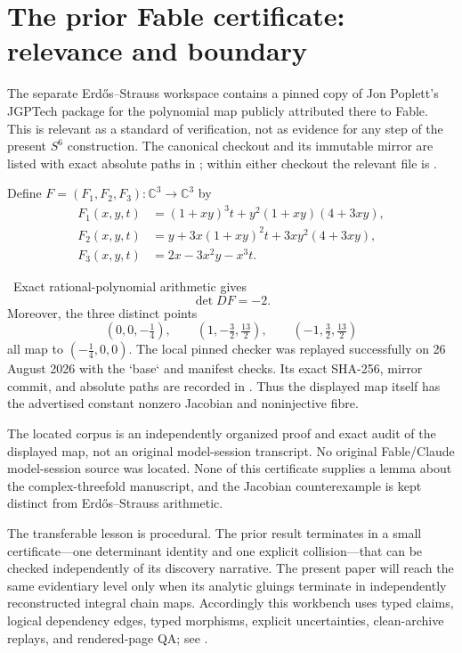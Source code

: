 \section{The prior Fable certificate: relevance and boundary}

The separate Erd\H{o}s--Strauss workspace contains a pinned copy of Jon
Poplett's JGPTech package for the polynomial map publicly attributed there to
Fable.  This is relevant as a standard of verification, not as evidence for
any step of the present $S^6$ construction.  The canonical checkout and its
immutable mirror are listed with exact absolute paths in
; within either checkout the relevant
file is .

Define $F=(F_1,F_2,F_3)\colon\mathbb C^3\to\mathbb C^3$ by
\begin{align*}
F_1(x,y,t)&=(1+xy)^3t+y^2(1+xy)(4+3xy),\\
F_2(x,y,t)&=y+3x(1+xy)^2t+3xy^2(4+3xy),\\
F_3(x,y,t)&=2x-3x^2y-x^3t.
\end{align*}

\begin{proposition}
\Verified\ Exact rational-polynomial arithmetic gives
\[
\det DF=-2.
\]
Moreover, the three distinct points
\[
\left(0,0,-\tfrac14\right),\qquad
\left(1,-\tfrac32,\tfrac{13}{2}\right),\qquad
\left(-1,\tfrac32,\tfrac{13}{2}\right)
\]
all map to $(-\tfrac14,0,0)$.  The local pinned checker
 was replayed successfully on 26 August 2026 with
the `base` and manifest checks.  Its exact SHA-256, mirror commit, and
absolute paths are recorded in .
Thus the displayed map itself has the advertised constant nonzero Jacobian
and noninjective fibre.
\end{proposition}

\begin{remark}
The located corpus is an independently organized proof and exact audit of the
displayed map, not an original model-session transcript.  No original
Fable/Claude model-session source was located.  None of this certificate
supplies a lemma about the complex-threefold manuscript, and the Jacobian
counterexample is kept distinct from Erd\H{o}s--Strauss arithmetic.
\end{remark}

The transferable lesson is procedural.  The prior result terminates in a
small certificate---one determinant identity and one explicit collision---that
can be checked independently of its discovery narrative.  The present paper
will reach the same evidentiary level only when its analytic gluings terminate
in independently reconstructed integral chain maps.  Accordingly this
workbench uses typed claims, logical dependency edges, typed morphisms,
explicit uncertainties, clean-archive replays, and rendered-page QA; see
.
